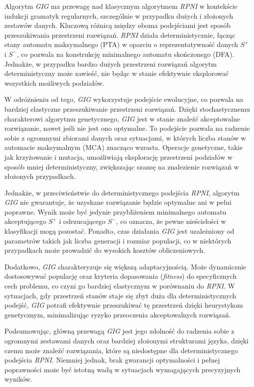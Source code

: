 Algorytm \textit{GIG} ma przewagę nad klasycznym algorytmem \textit{RPNI} w kontekście indukcji gramatyk regularnych, szczególnie w przypadku dużych i złożonych zestawów danych. Kluczową różnicą między oboma podejściami jest sposób przeszukiwania przestrzeni rozwiązań. \textit{RPNI} działa deterministycznie, łącząc stany automatu maksymalnego (PTA) w oparciu o reprezentatywność danych \( S^+ \) i \( S^- \), co pozwala na konstrukcję minimalnego automatu skończonego (DFA). Jednakże, w przypadku bardzo dużych przestrzeni rozwiązań algorytm deterministyczny może zawieść, nie będąc w stanie efektywnie eksplorować wszystkich możliwych podziałów.

W odróżnieniu od tego, \textit{GIG} wykorzystuje podejście ewolucyjne, co pozwala na bardziej elastyczne przeszukiwanie przestrzeni rozwiązań. Dzięki stochastycznemu charakterowi algorytmu genetycznego, \textit{GIG} jest w stanie znaleźć akceptowalne rozwiązanie, nawet jeśli nie jest ono optymalne. To podejście pozwala na radzenie sobie z ogromnymi zbiorami danych oraz sytuacjami, w których liczba stanów w automacie maksymalnym (MCA) znacząco wzrasta. Operacje genetyczne, takie jak krzyżowanie i mutacja, umożliwiają eksplorację przestrzeni podziałów w sposób mniej deterministyczny, zwiększając szansę na znalezienie rozwiązań w złożonych przypadkach.

Jednakże, w przeciwieństwie do deterministycznego podejścia \textit{RPNI}, algorytm \textit{GIG} nie gwarantuje, że uzyskane rozwiązanie będzie optymalne ani w pełni poprawne. Wynik może być jedynie przybliżeniem minimalnego automatu akceptującego \( S^+ \) i odrzucającego \( S^- \), co oznacza, że pewne nieścisłości w klasyfikacji mogą pozostać. Ponadto, czas działania \textit{GIG} jest uzależniony od parametrów takich jak liczba generacji i rozmiar populacji, co w niektórych przypadkach może prowadzić do wysokich kosztów obliczeniowych.

Dodatkowo, \textit{GIG} charakteryzuje się większą adaptacyjnością. Może dynamicznie dostosowywać populację oraz kryteria dopasowania (\textit{fitness}) do specyficznych cech problemu, co czyni go bardziej elastycznym w porównaniu do \textit{RPNI}. W sytuacjach, gdy przestrzeń stanów staje się zbyt duża dla deterministycznych podejść, \textit{GIG} potrafi efektywnie przeszukiwać tę przestrzeń dzięki heurystykom genetycznym, minimalizując ryzyko przeoczenia akceptowalnych rozwiązań.

Podsumowując, główną przewagą \textit{GIG} jest jego zdolność do radzenia sobie z ogromnymi zestawami danych oraz bardziej złożonymi strukturami języka, dzięki czemu może znaleźć rozwiązania, które są niedostępne dla deterministycznego podejścia \textit{RPNI}. Niemniej jednak, brak gwarancji optymalności i pełnej poprawności może być istotną wadą w sytuacjach wymagających precyzyjnych wyników.

